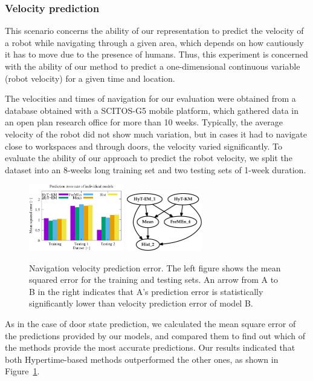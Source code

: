 \subsubsection{Velocity prediction}

This scenario concerns the ability of our representation to predict the velocity of a robot while navigating through a given area, which depends on how cautiously it has to move due to the presence of humans.
Thus, this experiment is concerned with the ability of our method to predict a one-dimensional continuous variable (robot velocity) for a given time and location. 

The velocities and times of navigation for our evaluation were obtained from a database obtained with a SCITOS-G5 mobile platform, which gathered data in an open plan research office for more than 10 weeks.
Typically, the average velocity of the robot did not show much variation, but in cases it had to navigate close to workspaces and through doors, the velocity varied significantly.
To evaluate the ability of our approach to predict the robot velocity, we split the dataset into an 8-weeks long training set and two testing sets of 1-week duration.
%
\begin{figure}[!ht]
   \begin{center}
   \hfill
      \includegraphics[height=2.9cm]{fig/nav_graph}
      \hfill
      \includegraphics[height=2.5cm]{fig/nav_stat}
      \caption{Navigation velocity prediction error. The left figure shows the mean squared error for the training and testing sets.
An arrow from A to B in the right indicates that A's prediction error is statistically significantly lower than velocity prediction error of model B.\label{fig:navigation}}
   \end{center}
\end{figure}
%
As in the case of door state prediction, we calculated the mean square error of the predictions provided by our models, and compared them to find out which of the methods provide the most accurate predictions. 
Our results indicated that both Hypertime-based methods outperformed the other ones, as shown in Figure~\ref{fig:navigation}.

